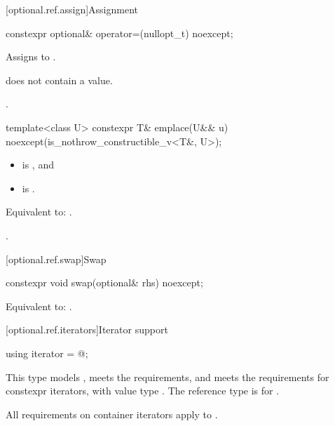 [optional.ref.assign]{Assignment}

%
\begin{itemdecl}
constexpr optional& operator=(nullopt_t) noexcept;
\end{itemdecl}

\begin{itemdescr}
\pnum
\effects
Assigns  to .

\pnum
\ensures
{} does not contain a value.

\pnum
\returns
{}.
\end{itemdescr}

%
\begin{itemdecl}
template<class U>
  constexpr T& emplace(U&& u) noexcept(is_nothrow_constructible_v<T&, U>);
\end{itemdecl}

\begin{itemdescr}
\pnum
\constraints
\begin{itemize}
\item {} is , and
\item {} is .
\end{itemize}

\pnum
\effects
Equivalent to: .

\pnum
\returns
{}.
\end{itemdescr}

[optional.ref.swap]{Swap}

%
\begin{itemdecl}
constexpr void swap(optional& rhs) noexcept;
\end{itemdecl}

\begin{itemdescr}
\pnum
\effects
Equivalent to: .
\end{itemdescr}

[optional.ref.iterators]{Iterator support}

%
\begin{itemdecl}
using iterator = @\impdef@;
\end{itemdecl}

\begin{itemdescr}
\pnum
This type models , meets the  requirements, and meets the requirements for constexpr iterators, with value type . The reference type is  for .

\pnum
All requirements on container iterators apply to .
\end{itemdescr}

